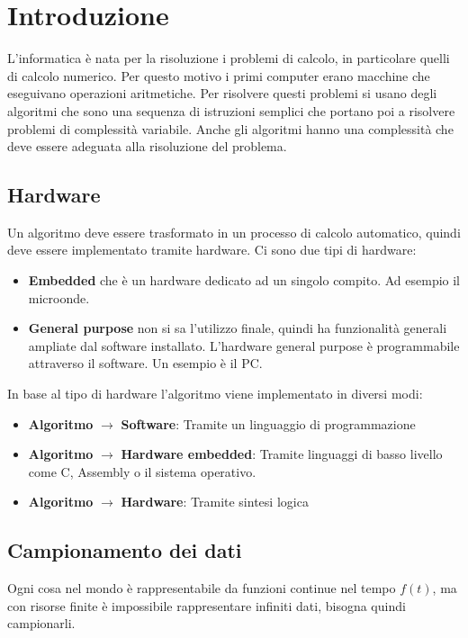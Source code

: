 \documentclass[a4paper]{article}
\theoremstyle{break}
\theoremstyle{break}
\theoremstyle{break}
\theoremstyle{break}
\begin{document}


\tableofcontents
\pagebreak
\section{Introduzione}
L'informatica è nata per la risoluzione i problemi di calcolo, in particolare
quelli di calcolo numerico. Per questo motivo i primi computer erano macchine
che eseguivano operazioni aritmetiche. Per risolvere questi problemi si usano
degli algoritmi che sono una sequenza di istruzioni semplici che portano poi
a risolvere problemi di complessità variabile. Anche gli algoritmi hanno una
complessità che deve essere adeguata alla risoluzione del problema.

\subsection{Hardware}
Un algoritmo deve essere trasformato in un processo di calcolo automatico,
quindi deve essere implementato tramite hardware. Ci sono due tipi di hardware:
\begin{itemize}
	\item \textbf{Embedded} che è un hardware dedicato ad un singolo compito.
	      Ad esempio il microonde.
	\item \textbf{General purpose} non si sa l'utilizzo finale, quindi ha
	      funzionalità generali ampliate dal software installato. L'hardware
	      general purpose è programmabile attraverso il software. Un esempio
	      è il PC.
\end{itemize}

In base al tipo di hardware l'algoritmo viene implementato in diversi modi:
\begin{itemize}
	\item \textbf{Algoritmo} \( \to  \) \textbf{Software}: Tramite un linguaggio di programmazione
	\item \textbf{Algoritmo} \( \to  \)  \textbf{Hardware embedded}: Tramite linguaggi di basso livello
	      come C, Assembly o il sistema operativo.
	\item \textbf{Algoritmo} \( \to  \)  \textbf{Hardware}: Tramite sintesi logica
\end{itemize}

\subsection{Campionamento dei dati}
Ogni cosa nel mondo è rappresentabile da funzioni continue nel tempo \( f(t) \),
ma con risorse finite è impossibile rappresentare infiniti dati, bisogna quindi
campionarli.
\end{document}
